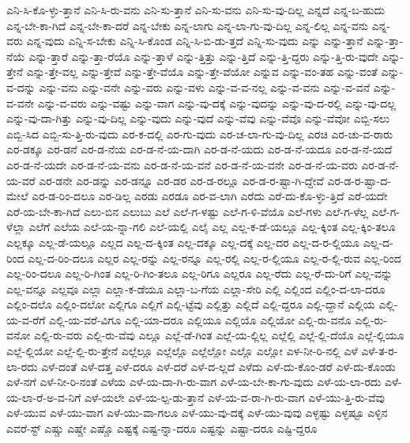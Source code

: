 {ಎನಿ-ಸಿ-ಕೊ-ಳ್ಳು-ತ್ತಾನೆ
ಎನಿ-ಸಿ-ರು-ವನು
ಎನಿ-ಸು-ತ್ತಾನೆ
ಎನಿ-ಸು-ವನು
ಎನಿ-ಸು-ವು-ದಿಲ್ಲ
ಎನ್ನದೆ
ಎನ್ನ-ಬ-ಹುದು
ಎನ್ನ-ಬೇ-ಕಾ-ಗಿದೆ
ಎನ್ನ-ಬೇ-ಕಾ-ದರೆ
ಎನ್ನ-ಬೇಕು
ಎನ್ನ-ಲಾಗು
ಎನ್ನ-ಲಾ-ಗು-ವು-ದಿಲ್ಲ
ಎನ್ನ-ಲಿಲ್ಲ
ಎನ್ನ-ವನು
ಎನ್ನ-ವರು
ಎನ್ನ-ವುದು
ಎನ್ನಿ-ಸ-ಬೇಕು
ಎನ್ನಿ-ಸಿ-ಕೊಂಡ
ಎನ್ನಿ-ಸಿ-ಬಿ-ಡು-ತ್ತದೆ
ಎನ್ನಿ-ಸು-ವುದು
ಎನ್ನು
ಎನ್ನು-ತ್ತಾನೆ
ಎನ್ನು-ತ್ತಾ-ನೆಯೆ
ಎನ್ನು-ತ್ತಾರೆ
ಎನ್ನು-ತ್ತಾ-ರೆಯೊ
ಎನ್ನು-ತ್ತಾಳೆ
ಎನ್ನು-ತ್ತಿತ್ತು
ಎನ್ನು-ತ್ತಿದೆ
ಎನ್ನು-ತ್ತಿ-ದ್ದರು
ಎನ್ನು-ತ್ತಿ-ರು-ವುದೇ
ಎನ್ನು-ತ್ತೇನೆ
ಎನ್ನು-ತ್ತೇ-ವಲ್ಲ
ಎನ್ನು-ತ್ತೇವೆ
ಎನ್ನು-ತ್ತೇ-ವೆಯೊ
ಎನ್ನು-ತ್ತೇ-ವೆಯೋ
ಎನ್ನುವ
ಎನ್ನು-ವಂ-ತಹ
ಎನ್ನು-ವಂತೆ
ಎನ್ನು-ವ-ದನ್ನು
ಎನ್ನು-ವನು
ಎನ್ನು-ವನೇ
ಎನ್ನು-ವರು
ಎನ್ನು-ವಳು
ಎನ್ನು-ವ-ವ-ನಲ್ಲ
ಎನ್ನು-ವ-ವನು
ಎನ್ನು-ವ-ವನೆ
ಎನ್ನು-ವ-ವನೇ
ಎನ್ನು-ವ-ವರು
ಎನ್ನು-ವಷ್ಟು
ಎನ್ನು-ವಾಗ
ಎನ್ನು-ವು-ದಕ್ಕೆ
ಎನ್ನು-ವುದನ್ನು
ಎನ್ನು-ವು-ದ-ರಲ್ಲಿ
ಎನ್ನು-ವು-ದಲ್ಲ
ಎನ್ನು-ವು-ದಾ-ಗಿತ್ತು
ಎನ್ನು-ವು-ದಿಲ್ಲ
ಎನ್ನು-ವುದು
ಎನ್ನು-ವುದೆ
ಎನ್ನು-ವೆವು
ಎನ್ನು-ವೆವೊ
ಎನ್ನು-ವೆವೋ
ಎಬ್ಬಿ-ಸಲು
ಎಬ್ಬಿ-ಸಿದ
ಎಬ್ಬಿ-ಸು-ತ್ತಿ-ರು-ವುದು
ಎರ-ಕ-ದಲ್ಲಿ
ಎರ-ಗು-ವುದು
ಎರ-ಚ-ಲಾ-ಗು-ವು-ದಿಲ್ಲ
ಎರಚಿ
ಎರ-ಚು-ವ-ರಾರು
ಎರ-ಡಕ್ಕೂ
ಎರ-ಡನೆ
ಎರ-ಡ-ನೆಯ
ಎರ-ಡ-ನೆ-ಯ-ದಾಗಿ
ಎರ-ಡ-ನೆ-ಯದು
ಎರ-ಡ-ನೆ-ಯದೂ
ಎರ-ಡ-ನೆ-ಯದೆ
ಎರ-ಡ-ನೆ-ಯದೇ
ಎರ-ಡ-ನೆ-ಯ-ವನು
ಎರ-ಡ-ನೆ-ಯ-ವನೆ
ಎರ-ಡ-ನೆ-ಯ-ವನೇ
ಎರ-ಡ-ನೆ-ಯ-ವರು
ಎರ-ಡ-ನೆ-ಯ-ವರೆ
ಎರ-ಡನೇ
ಎರ-ಡನ್ನು
ಎರ-ಡನ್ನೂ
ಎರ-ಡರ
ಎರ-ಡ-ರಲ್ಲೂ
ಎರ-ಡ-ರ-ಷ್ಟಾ-ಗಿ-ದ್ದೇವೆ
ಎರ-ಡ-ರ-ಷ್ಟಾ-ದ-ಮೇಲೆ
ಎರ-ಡ-ರಿಂ-ದಲೂ
ಎರ-ಡಿಲ್ಲ
ಎರಡು
ಎರಡೂ
ಎರ-ವ-ಲಾಗಿ
ಎರೆದು
ಎರೆ-ದು-ಕೊ-ಳ್ಳು-ತ್ತಿದೆ
ಎರೆ-ಯದೇ
ಎರೆ-ಯ-ಬೇ-ಕಾ-ಗಿದೆ
ಎಲು-ಬಿನ
ಎಲುಬು
ಎಲೆ
ಎಲೆ-ಗ-ಳಷ್ಟು
ಎಲೆ-ಗ-ಳಿ-ವೆಯೊ
ಎಲೆ-ಗಳು
ಎಲೆ-ಗ-ಳೆಲ್ಲ
ಎಲೆ-ಗ-ಳೆಲ್ಲಾ
ಎಲೆಗೆ
ಎಲೆಯ
ಎಲೆ-ಯ-ನ್ನಾ-ಗಲಿ
ಎಲೆ-ಯಲ್ಲಿ
ಎಲೈ
ಎಲ್ಲ
ಎಲ್ಲ-ಕ-ಡೆ-ಯಲ್ಲೂ
ಎಲ್ಲ-ಕ್ಕಿಂತ
ಎಲ್ಲ-ಕ್ಕಿಂ-ತಲೂ
ಎಲ್ಲಕ್ಕೂ
ಎಲ್ಲ-ಡೆ-ಯಲ್ಲೂ
ಎಲ್ಲದ
ಎಲ್ಲ-ದ-ಕ್ಕಿಂತ
ಎಲ್ಲ-ದಕ್ಕೂ
ಎಲ್ಲ-ದಕ್ಕೆ
ಎಲ್ಲ-ದರ
ಎಲ್ಲ-ದ-ರ-ಲ್ಲಿಯೂ
ಎಲ್ಲ-ದ-ರಿಂದ
ಎಲ್ಲ-ದ-ರಿಂ-ದಲೂ
ಎಲ್ಲರ
ಎಲ್ಲ-ರನ್ನು
ಎಲ್ಲ-ರನ್ನೂ
ಎಲ್ಲ-ರಲ್ಲಿ
ಎಲ್ಲ-ರ-ಲ್ಲಿಯೂ
ಎಲ್ಲ-ರ-ಲ್ಲಿ-ರುವ
ಎಲ್ಲ-ರಿಂದ
ಎಲ್ಲ-ರಿಂ-ದಲೂ
ಎಲ್ಲ-ರಿ-ಗಿಂತ
ಎಲ್ಲ-ರಿ-ಗಿಂ-ತಲೂ
ಎಲ್ಲ-ರಿಗೂ
ಎಲ್ಲರೂ
ಎಲ್ಲ-ರೆದು
ಎಲ್ಲ-ರೆ-ದು-ರಿಗೆ
ಎಲ್ಲ-ವನ್ನು
ಎಲ್ಲ-ವನ್ನೂ
ಎಲ್ಲವೂ
ಎಲ್ಲಾ
ಎಲ್ಲಾ-ಕ-ಡೆಯೂ
ಎಲ್ಲಾ-ಬ-ಗೆಯ
ಎಲ್ಲಾ-ಸೇರಿ
ಎಲ್ಲಿ
ಎಲ್ಲಿಂದ
ಎಲ್ಲಿಂ-ದ-ಲಾ-ದರೂ
ಎಲ್ಲಿಂ-ದಲೊ
ಎಲ್ಲಿಂ-ದಲೋ
ಎಲ್ಲಿಗೂ
ಎಲ್ಲಿಗೆ
ಎಲ್ಲಿ-ಟ್ಟೆವು
ಎಲ್ಲಿತ್ತು
ಎಲ್ಲಿದೆ
ಎಲ್ಲಿ-ದ್ದರೂ
ಎಲ್ಲಿ-ದ್ದಾನೆ
ಎಲ್ಲಿಯ
ಎಲ್ಲಿ-ಯ-ವ-ರೆಗೆ
ಎಲ್ಲಿ-ಯ-ವರೆ-ವಿಗೂ
ಎಲ್ಲಿ-ಯಾ-ದರೂ
ಎಲ್ಲಿಯೂ
ಎಲ್ಲಿಯೊ
ಎಲ್ಲಿಯೋ
ಎಲ್ಲಿ-ರು-ವನೊ
ಎಲ್ಲಿ-ರು-ವನೋ
ಎಲ್ಲಿ-ರು-ವರು
ಎಲ್ಲಿ-ರು-ವೆವು
ಎಲ್ಲೂ
ಎಲ್ಲೆ-ಡೆ-ಗಿಂತ
ಎಲ್ಲೆ-ಯ-ಲ್ಲಿಲ್ಲ
ಎಲ್ಲೆಲ್ಲಿ
ಎಲ್ಲೆ-ಲ್ಲಿ-ದೆಯೊ
ಎಲ್ಲೆ-ಲ್ಲಿಯೂ
ಎಲ್ಲೆ-ಲ್ಲಿಯೋ
ಎಲ್ಲೆ-ಲ್ಲಿ-ರು-ತ್ತೇನೆ
ಎಲ್ಲೆಲ್ಲೂ
ಎಲ್ಲೆಲ್ಲೊ
ಎಲ್ಲೆಲ್ಲೋ
ಎಲ್ಲೊ
ಎಲ್ಲೋ
ಎಳ-ನೀ-ರಿ-ನಲ್ಲಿ
ಎಳೆ
ಎಳೆ-ತ-ರ-ಲಾ-ರದು
ಎಳೆ-ದಂತೆ
ಎಳೆ-ದತ್ತ
ಎಳೆ-ದರೂ
ಎಳೆ-ದರೆ
ಎಳೆ-ದ-ಲ್ಲದೆ
ಎಳೆದು
ಎಳೆ-ದು-ಕೊಂ-ಡರೆ
ಎಳೆ-ದು-ಕೊಂಡು
ಎಳೆ-ನಗೆ
ಎಳೆ-ನೀ-ರಿ-ನಂತೆ
ಎಳೆಯ
ಎಳೆ-ಯ-ದಾ-ಗಿ-ರು-ವಾಗ
ಎಳೆ-ಯ-ಬೇ-ಕಾ-ಗು-ವುದು
ಎಳೆ-ಯ-ಲಾ-ರದು
ಎಳೆ-ಯ-ಲಾ-ರೆ-ಅ-ವ-ನಿಗೆ
ಎಳೆ-ಯಲೇ
ಎಳೆ-ಯ-ಲ್ಪ-ಡು-ತ್ತಾನೆ
ಎಳೆ-ಯ-ವ-ರಾ-ಗಿ-ರು-ವಾಗ
ಎಳೆ-ಯು-ತ್ತಿ-ರು-ವೆವು
ಎಳೆ-ಯುವ
ಎಳೆ-ಯು-ವಾಗ
ಎಳೆ-ಯು-ವಾ-ಗಲೂ
ಎಳೆ-ಯು-ವು-ದಕ್ಕೆ
ಎಳೆ-ಯು-ವುವು
ಎಳ್ಳಷ್ಟು
ಎಳ್ಳಷ್ಟೂ
ಎಳ್ಳಿನ
ಎವರೆ-ಸ್ಟ್
ಎಷ್ಚು
ಎಷ್ಚೇ
ಎಷ್ಚೊ
ಎಷ್ಟಕ್ಕೆ
ಎಷ್ಟ-ನ್ನಾ-ದರೂ
ಎಷ್ಟನ್ನು
ಎಷ್ಟಾ-ದರೂ
ಎಷ್ಟಿ-ದ್ದರೂ
}
